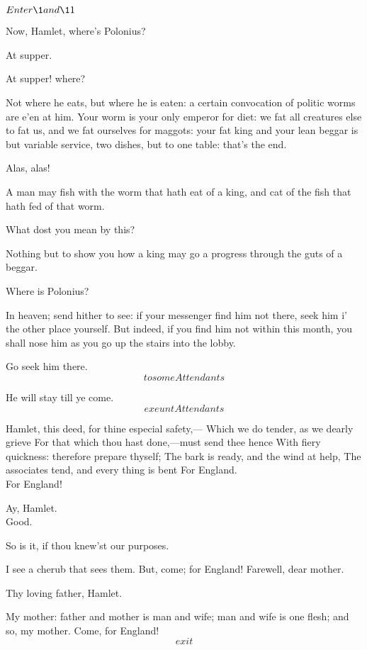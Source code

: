 \documentclass[11pt]{book}
\begin{document}
	\(Enter \1 and \11\)

\2	Now, Hamlet, where's Polonius?

\Prosa

\1	At supper.

\2	At supper! where?

\1	Not where he eats, but where he is eaten: a certain
	convocation of politic worms are e'en at him. Your
	worm is your only emperor for diet: we fat all
	creatures else to fat us, and we fat ourselves for
	maggots: your fat king and your lean beggar is but
	variable service, two dishes, but to one table:
	that's the end.

\2	Alas, alas!

\1	A man may fish with the worm that hath eat of a
	king, and cat of the fish that hath fed of that worm.

\2	What dost you mean by this?

\1	Nothing but to show you how a king may go a
	progress through the guts of a beggar.

\2	Where is Polonius?

\1	In heaven; send hither to see: if your messenger
	find him not there, seek him i' the other place
	yourself. But indeed, if you find him not within
	this month, you shall nose him as you go up the
	stairs into the lobby.

\2	Go seek him there. \[to some Attendants\]

\1	He will stay till ye come. \[exeunt Attendants\]
\endProsa

\2	Hamlet, this deed, for thine especial safety,---
	Which we do tender, as we dearly grieve
	For that which thou hast done,---must send thee hence
	With fiery quickness: therefore prepare thyself;
	The bark is ready, and the wind at help,
	The associates tend, and every thing is bent
	For England. \\

\1	                  For England!

\2	Ay, Hamlet. \\

\1	Good.

\2	So is it, if thou knew'st our purposes.

\Prosa
\1	I see a cherub that sees them. But, come; for
	England! Farewell, dear mother.

\2	Thy loving father, Hamlet.

\1	My mother: father and mother is man and wife; man
	and wife is one flesh; and so, my mother. Come, for England!
	\[exit\]
\endProsa
\end{document}
